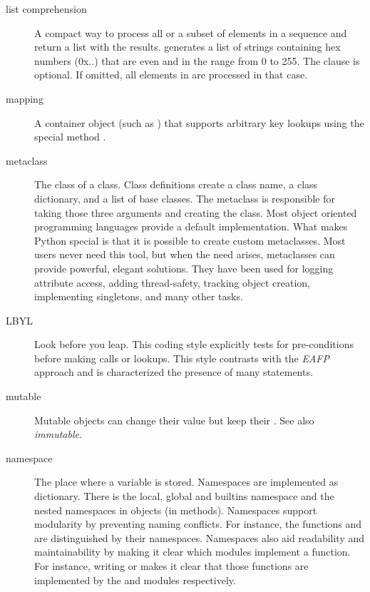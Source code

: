 \begin{description}
\item[list comprehension]
A compact way to process all or a subset of elements in a sequence and
return a list with the results.   generates a list of strings
containing hex numbers (0x..) that are even and in the range from 0 to 255.
The  clause is optional.  If omitted, all elements in
{} are processed in that case.

\item[mapping]
A container object (such as ) that supports arbitrary key
lookups using the special method .

\item[metaclass]
The class of a class.  Class definitions create a class name, a class
dictionary, and a list of base classes.  The metaclass is responsible
for taking those three arguments and creating the class.  Most object
oriented programming languages provide a default implementation.  What
makes Python special is that it is possible to create custom
metaclasses.  Most users never need this tool, but when the need
arises, metaclasses can provide powerful, elegant solutions.  They
have been used for logging attribute access, adding thread-safety,
tracking object creation, implementing singletons, and many other
tasks.

\item[LBYL]
Look before you leap.  This coding style explicitly tests for
pre-conditions before making calls or lookups.  This style contrasts
with the \emph{EAFP} approach and is characterized the presence of
many  statements.

\item[mutable]
Mutable objects can change their value but keep their .
See also \emph{immutable}.

\item[namespace]
The place where a variable is stored.  Namespaces are implemented as
dictionary.  There is the local, global and builtins namespace and the
nested namespaces in objects (in methods).  Namespaces support
modularity by preventing naming conflicts.  For instance, the
functions  and  are
distinguished by their namespaces.  Namespaces also aid readability
and maintainability by making it clear which modules implement a
function.  For instance, writing  or
{} makes it clear that those functions are
implemented by the  and 
modules respectively.


\end{description}
